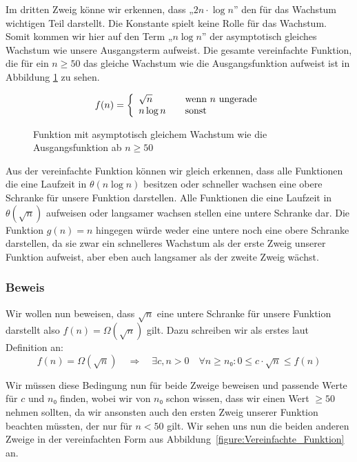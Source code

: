 \documentclass[a4paper, 12pt]{article}
\begin{document}
Im dritten Zweig könne wir erkennen, dass „$2 n ⋅ \log n$” den für das
Wachstum wichtigen Teil darstellt. Die Konstante spielt keine Rolle für das
Wachstum. Somit kommen wir hier auf den Term „$n \log n$” der asymptotisch
gleiches Wachstum wie unsere Ausgangsterm aufweist. Die gesamte vereinfachte
Funktion, die für ein $n≥ 50$ das gleiche Wachstum wie die Ausgangsfunktion
aufweist ist in Abbildung \ref{Figure:Vereinfachte_Funktion_Gleiches_Wachstum}
zu sehen.

\begin{figure}[H]
	\caption{Funktion mit asymptotisch gleichem Wachstum wie die
	Ausgangsfunktion ab $n≥50$}
	\label{Figure:Vereinfachte_Funktion_Gleiches_Wachstum}
\[
	\label{function:Laufzeit_Vereinfacht}
	f(n) = \left\{
	\begin{array}{l l}
		\sqrt n     & \quad \text{wenn $n$ ungerade}\\
		n \log n    & \quad \text{sonst}
	\end{array} \right.
\]
\end{figure}

Aus der vereinfachte Funktion können wir gleich erkennen, dass alle Funktionen
die eine Laufzeit in $θ\left(n \log n\right)$ besitzen oder schneller wachsen
eine obere Schranke für unsere Funktion darstellen. Alle Funktionen die eine
Laufzeit in $θ\left( \sqrt n\right)$ aufweisen oder langsamer wachsen stellen
eine untere Schranke dar. Die Funktion $g\left(n\right)=n$ hingegen würde
weder eine untere noch eine obere Schranke darstellen, da sie zwar ein
schnelleres Wachstum als der erste Zweig unserer Funktion aufweist, aber eben
auch langsamer als der zweite Zweig wächst.

\subsubsection{Beweis}

Wir wollen nun beweisen, dass $\sqrt n$ eine untere Schranke für unsere
Funktion darstellt also $f\left(n\right) = Ω \left(\sqrt n\right)$ gilt. Dazu
schreiben wir als erstes laut Definition an:
\[
	f\left(n\right)=Ω \left(\sqrt n\right) \quad ⇒ \quad
	∃ c,n > 0 \quad ∀ n≥ n₀: 0 ≤ c ⋅ \sqrt n ≤ f\left(n\right)
\]

Wir müssen diese Bedingung nun für beide Zweige beweisen und passende Werte
für $c$ und $n₀$ finden, wobei wir von $n₀$ schon wissen, dass wir einen Wert
$≥ 50$ nehmen sollten, da wir ansonsten auch den ersten Zweig unserer Funktion
beachten müssten, der nur für $n < 50$ gilt. Wir sehen uns nun die beiden
anderen Zweige in der vereinfachten Form aus
Abbildung~\ref{figure:Vereinfachte_Funktion} an.
\end{document}
